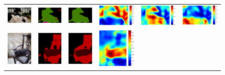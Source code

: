 \documentclass[10pt,twocolumn,letterpaper]{article}
\begin{document}
\begin{figure}
\begin{tabular}{c c c c c c}
   \includegraphics[height=0.08\linewidth]{fig/voc12/img/2007_000491.jpg} &
   \includegraphics[height=0.08\linewidth]{fig/voc12/res_baseline/2007_000491.png} &
   \includegraphics[height=0.08\linewidth]{fig/voc12/res_sharenet/2007_000491.png} &
   \includegraphics[height=0.08\linewidth]{fig/voc12/att1/2007_000491.pdf} &
   \includegraphics[height=0.08\linewidth]{fig/voc12/att2/2007_000491.pdf} &
   \includegraphics[height=0.08\linewidth]{fig/voc12/att3/2007_000491.pdf} \\
   \includegraphics[height=0.12\linewidth]{fig/voc12/img/2011_000813.jpg} &
   \includegraphics[height=0.12\linewidth]{fig/voc12/res_baseline/2011_000813.png} &
   \includegraphics[height=0.12\linewidth]{fig/voc12/res_sharenet/2011_000813.png} &
   \includegraphics[height=0.12\linewidth]{fig/voc12/att1/2011_000813.pdf} &

\end{tabular}
\end{figure}
\end{document}
